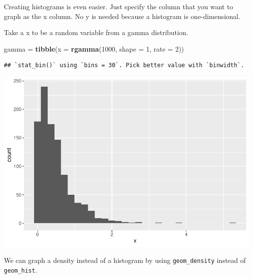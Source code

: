 \documentclass[]{book}
\newenvironment{Shaded}{\begin{snugshade}}{\end{snugshade}}
\newcommand{\DataTypeTok}[1]{\textcolor[rgb]{0.13,0.29,0.53}{#1}}
\newcommand{\DecValTok}[1]{\textcolor[rgb]{0.00,0.00,0.81}{#1}}
\newcommand{\KeywordTok}[1]{\textcolor[rgb]{0.13,0.29,0.53}{\textbf{#1}}}
\newcommand{\NormalTok}[1]{#1}
\newcommand{\OperatorTok}[1]{\textcolor[rgb]{0.81,0.36,0.00}{\textbf{#1}}}
\newcommand{\StringTok}[1]{\textcolor[rgb]{0.31,0.60,0.02}{#1}}
\begin{document}
Creating histograms is even easier. Just specify the column that you want to graph as the x column. No y is needed because a histogram is one-dimensional.

Take a x to be a random variable from a gamma distribution.

\begin{Shaded}
\begin{Highlighting}[]
\NormalTok{gamma =}\StringTok{ }\KeywordTok{tibble}\NormalTok{(}\DataTypeTok{x =} \KeywordTok{rgamma}\NormalTok{(}\DecValTok{1000}\NormalTok{, }\DataTypeTok{shape =} \DecValTok{1}\NormalTok{, }\DataTypeTok{rate =} \DecValTok{2}\NormalTok{))}
\end{Highlighting}
\end{Shaded}

\begin{Shaded}
\end{Shaded}

\begin{verbatim}
## `stat_bin()` using `bins = 30`. Pick better value with `binwidth`.
\end{verbatim}

\includegraphics{bookdown-demo_files/figure-latex/unnamed-chunk-16-1.pdf}

We can graph a density instead of a histogram by using \texttt{geom\_density} instead of \texttt{geom\_hist}.
\end{document}

